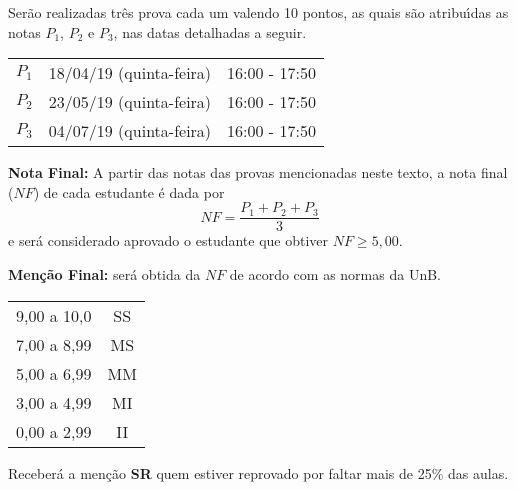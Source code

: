 \documentclass[12pt]{article}
\begin{document}
 Ser\~ao realizadas tr\^es prova cada um valendo 10 pontos, as quais s\~ao atribu{\'\i}das as notas $P_1$, $P_2$ e $P_3$, nas datas detalhadas a seguir.

\begin{center}
    \begin{tabular}{|c|c|c|}
        \hline\hline
        \hspace{1cm}{\bf Prova}\hspace{1cm} & \hspace{3cm}{\bf Data}\hspace{3cm} & \hspace{1.7cm}{\bf Hor\'ario}\hspace{1.7cm} \\
        \hline\hline
        $P_1$ & 18/04/19 (quinta-feira) \phantom{x} & 16:00 - 17:50 \\
        \hline
        $P_2$ & 23/05/19 (quinta-feira) \phantom{x} & 16:00 - 17:50 \\
        \hline
        $P_3$ & 04/07/19 (quinta-feira) \phantom{x} & 16:00 - 17:50 \\
        \hline\hline
    \end{tabular}
\end{center}

{\bf \noindent Nota Final:} A partir das notas das provas mencionadas neste texto, a nota final ($NF$) de cada estudante \'e dada
por
\vspace{-0.15cm}
\[
NF = \frac{ P_1 + P_2 + P_3}{3} 
\]
e ser\'a considerado aprovado o estudante que obtiver $NF \geq 5,00$.

{\bf \noindent Men\c{c}\~ao Final:} ser\'a obtida da $NF$ de
acordo com as normas da UnB.
\begin{center}
    \begin{tabular}{c|c}
        \hline\hline
        \hspace{1cm}{Nota}\hspace{1cm} & \hspace{0.25cm}{Men\c{c}\~ao}\hspace{0.25cm}\\
        \hline\hline
        9,00 a 10,0 & SS \\
        \hline
        7,00 a 8,99 & MS \\
        \hline
        5,00 a 6,99 & MM \\
        \hline
        3,00 a 4,99 & MI \\
        \hline
        0,00 a 2,99  & II \\
        \hline\hline
    \end{tabular}
\end{center}
Receber\'a a men{\c c}\~ao {\bf SR} quem estiver reprovado por faltar mais de 25\%
das aulas.
\end{document}
